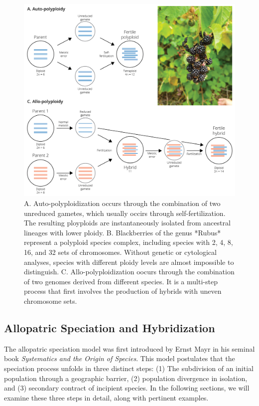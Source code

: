 \documentclass[
]{book}
\begin{document}
\begin{figure}
\includegraphics[width=1\linewidth]{images/polyploidization} \caption{A. Auto-polyploidization occurs through the combination of two unreduced gametes, which usually occirs through self-fertilization. The resulting ployploids are instantaneously isolated from ancestral lineages with lower ploidy. B. Blackberries of the genus *Rubus* represent a polyploid species complex, including species with 2, 4, 8, 16, and 32 sets of chromosomes. Without genetic or cytological analyses, species with different ploidy levels are almost impossible to distinguish. C. Allo-polyploidization oocurs through the combination of two genomes derived from different species. It is a multi-step process that first involves the production of hybrids with uneven chromosome sets.}\label{fig:polploid}
\end{figure}

\hypertarget{allopatric-speciation-and-hybridization}{%
\subsection{Allopatric Speciation and Hybridization}\label{allopatric-speciation-and-hybridization}}

The allopatric speciation model was first introduced by Ernst Mayr in his seminal book \emph{Systematics and the Origin of Species}. This model postulates that the speciation process unfolds in three distinct steps: (1) The subdivision of an initial population through a geographic barrier, (2) population divergence in isolation, and (3) secondary contract of incipient species. In the following sections, we will examine these three steps in detail, along with pertinent examples.
\end{document}
